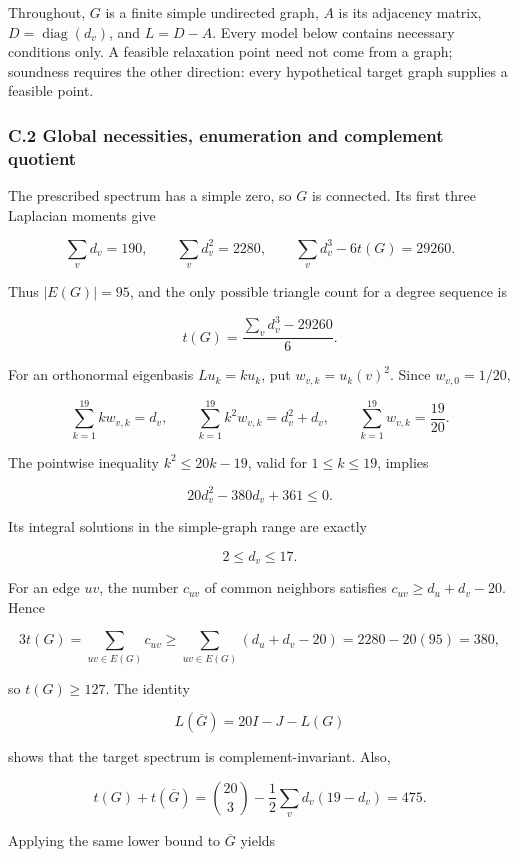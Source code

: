 \documentclass[
  english,
  11pt,
  a4paper,
]{article}
\begin{document}
Throughout, \(G\) is a finite simple undirected graph, \(A\) is its
adjacency matrix, \(D=\operatorname{diag}(d_v)\), and \(L=D-A\). Every
model below contains necessary conditions only. A feasible relaxation
point need not come from a graph; soundness requires the other
direction: every hypothetical target graph supplies a feasible point.

\subsubsection{C.2 Global necessities, enumeration and complement
quotient}\label{c.2-global-necessities-enumeration-and-complement-quotient}

The prescribed spectrum has a simple zero, so \(G\) is connected. Its
first three Laplacian moments give

\[
\sum_vd_v=190,\qquad
\sum_vd_v^2=2280,\qquad
\sum_vd_v^3-6t(G)=29260.
\tag{C.1}
\]

Thus \(|E(G)|=95\), and the only possible triangle count for a degree
sequence is

\[
t(G)=\frac{\sum_vd_v^3-29260}{6}.
\tag{C.2}
\]

For an orthonormal eigenbasis \(Lu_k=ku_k\), put \(w_{v,k}=u_k(v)^2\).
Since \(w_{v,0}=1/20\),

\[
\sum_{k=1}^{19}kw_{v,k}=d_v,\qquad
\sum_{k=1}^{19}k^2w_{v,k}=d_v^2+d_v,\qquad
\sum_{k=1}^{19}w_{v,k}=\frac{19}{20}.
\]

The pointwise inequality \(k^2\le20k-19\), valid for \(1\le k\le19\),
implies

\[
20d_v^2-380d_v+361\le0.
\]

Its integral solutions in the simple-graph range are exactly

\[
2\le d_v\le17.
\tag{C.3}
\]

For an edge \(uv\), the number \(c_{uv}\) of common neighbors satisfies
\(c_{uv}\ge d_u+d_v-20\). Hence

\[
3t(G)=\sum_{uv\in E(G)}c_{uv}
\ge\sum_{uv\in E(G)}(d_u+d_v-20)
=2280-20(95)=380,
\]

so \(t(G)\ge127\). The identity

\[
L(\overline G)=20I-J-L(G)
\]

shows that the target spectrum is complement-invariant. Also,

\[
t(G)+t(\overline G)
=\binom{20}{3}-\frac12\sum_vd_v(19-d_v)=475.
\tag{C.4}
\]

Applying the same lower bound to \(\overline G\) yields
\end{document}
